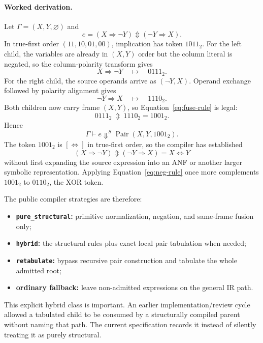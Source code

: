 \documentclass[10pt]{article}
\newcommand{\bxor}{\mathbin{\Updownarrow}}
\newcommand{\Pair}{\operatorname{Pair}}
\theoremstyle{plain}
\theoremstyle{definition}
\theoremstyle{remark}
\begin{document}
\paragraph{Worked derivation.}
Let $\Gamma=(X,Y,\varnothing)$ and
\begin{equation}
 e=(X\Rightarrow\neg Y)\bxor(\neg Y\Rightarrow X).
 \label{eq:worked-expression}
\end{equation}
In true-first order $(11,10,01,00)$, implication has token $1011_2$. For the left child, the variables are already in $(X,Y)$ order but the column literal is negated, so the column-polarity transform gives
\[
 X\Rightarrow\neg Y\quad\longmapsto\quad 0111_2.
\]
For the right child, the source operands arrive as $(\neg Y,X)$. Operand exchange followed by polarity alignment gives
\[
 \neg Y\Rightarrow X\quad\longmapsto\quad 1110_2.
\]
Both children now carry frame $(X,Y)$, so Equation~\eqref{eq:fuse-rule} is legal:
\begin{equation}
 0111_2\ \bxor\ 1110_2=1001_2.
 \label{eq:worked-fusion}
\end{equation}
Hence
\[
 \Gamma\vdash e\Downarrow^S\Pair(X,Y,1001_2).
\]
The token $1001_2$ is $[\Leftrightarrow]$ in true-first order, so the compiler has established
\[
 (X\Rightarrow\neg Y)\bxor(\neg Y\Rightarrow X)=X\Leftrightarrow Y
\]
without first expanding the source expression into an ANF or another larger symbolic representation. Applying Equation~\eqref{eq:neg-rule} once more complements $1001_2$ to $0110_2$, the XOR token.

The public compiler strategies are therefore:
\begin{itemize}
 \item \textbf{\texttt{pure\_structural}:} primitive normalization, negation, and same-frame fusion only;
 \item \textbf{\texttt{hybrid}:} the structural rules plus exact local pair tabulation when needed;
 \item \textbf{\texttt{retabulate}:} bypass recursive pair construction and tabulate the whole admitted root;
 \item \textbf{ordinary fallback:} leave non-admitted expressions on the general IR path.
\end{itemize}
This explicit hybrid class is important. An earlier implementation/review cycle allowed a tabulated child to be consumed by a structurally compiled parent without naming that path. The current specification records it instead of silently treating it as purely structural.
\end{document}
